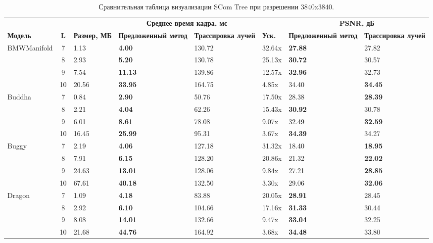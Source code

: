 \begin{table}[htbp]
  \centering
  \scriptsize
  \caption{Сравнительная таблица визуализации SCom Tree при разрешении 3840x3840.}
  \label{tab:scom_comparison_full_3840}
  \begin{tabular}{lcp{1cm}p{2cm}p{2cm}lp{2cm}p{2cm}}
    \toprule
    & & & \multicolumn{2}{c}{\textbf{Среднее время кадра, мс}} & & \multicolumn{2}{c}{\textbf{PSNR, дБ}}  \\
    \cmidrule(l){4-5} \cmidrule(l){7-8}
    \textbf{Модель} & \textbf{L} & \textbf{Размер, МБ} & \textbf{Предложенный метод} & \textbf{Трассировка лучей} & \textbf{Уск.} & \textbf{Предложенный метод} & \textbf{Трассировка лучей} \\
\midrule
    BMWManifold & 7 & 1.13 & \textbf{4.00} & 130.72 & 32.64x & \textbf{27.88} & 27.82 \\
     & 8 & 2.93 & \textbf{5.20} & 130.78 & 25.13x & \textbf{30.72} & 30.57 \\
     & 9 & 7.54 & \textbf{11.13} & 139.86 & 12.57x & \textbf{32.96} & 32.73 \\
     & 10 & 20.56 & \textbf{33.95} & 164.75 & 4.85x & 34.40 & \textbf{34.45} \\
    \midrule
    Buddha & 7 & 0.84 & \textbf{2.90} & 50.76 & 17.50x & 28.38 & \textbf{28.39} \\
     & 8 & 2.21 & \textbf{4.04} & 62.26 & 15.43x & \textbf{30.92} & 30.78 \\
     & 9 & 6.01 & \textbf{8.61} & 78.08 & 9.07x & 32.49 & \textbf{32.59} \\
     & 10 & 16.45 & \textbf{25.99} & 95.31 & 3.67x & \textbf{34.39} & 34.27 \\
    \midrule
    Buggy & 7 & 2.19 & \textbf{4.06} & 127.18 & 31.32x & 18.40 & \textbf{18.95} \\
     & 8 & 7.91 & \textbf{6.15} & 128.20 & 20.86x & 21.32 & \textbf{22.02} \\
     & 9 & 24.63 & \textbf{13.01} & 128.06 & 9.84x & 27.21 & \textbf{28.85} \\
     & 10 & 67.61 & \textbf{40.18} & 132.50 & 3.30x & 29.06 & \textbf{32.06} \\
    \midrule
    Dragon & 7 & 1.09 & \textbf{4.18} & 83.88 & 20.05x & \textbf{28.91} & 28.45 \\
     & 8 & 2.92 & \textbf{6.10} & 104.66 & 17.16x & \textbf{31.33} & 30.44 \\
     & 9 & 8.08 & \textbf{14.01} & 132.66 & 9.47x & \textbf{33.04} & 32.25 \\
     & 10 & 21.68 & \textbf{44.76} & 164.92 & 3.68x & \textbf{34.48} & 33.80 \\

\end{tabular}
\end{table}

